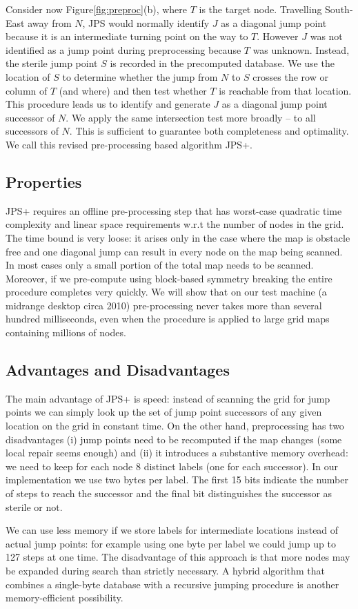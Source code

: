 Consider now Figure\ref{fig:preproc}(b), where $T$ is the target node.  
Travelling South-East away from $N$, JPS would normally identify 
$J$ as a diagonal jump point because it is an intermediate turning
point on the way to $T$.
However $J$ was not identified as a jump point during preprocessing 
because $T$ was unknown.  
Instead, the sterile jump point $S$ is recorded in the precomputed 
database. We use the location of $S$ to determine whether the jump from 
$N$ to $S$ crosses the row or column of $T$ (and where) and then test 
whether $T$ is reachable from that location. This procedure 
leads us to identify and generate $J$ as a diagonal jump point successor
of $N$. We apply the same intersection test more broadly -- to all 
successors of $N$. This is sufficient to guarantee both completeness 
and optimality. We call this revised pre-processing based algorithm 
JPS+.
\subsection*{Properties}
JPS+ requires an offline pre-processing step that has worst-case quadratic 
time complexity and linear space requirements w.r.t the number of nodes in 
the grid. The time bound is very loose: it arises only in the case 
where the map is obstacle free and one diagonal jump can result in
every node on the map being scanned. In most cases only a small portion
of the total map needs to be scanned. Moreover, if we pre-compute using block-based 
symmetry breaking the entire procedure completes very quickly.
We will show that on our test machine (a midrange desktop
circa 2010) pre-processing never takes more than several hundred milliseconds,
even when the procedure is applied to large grid maps containing millions
of nodes.
\subsection*{Advantages and Disadvantages}
The main advantage of JPS+ is speed: instead of scanning the grid for jump
points we can simply look up the set of jump point successors of any given
location on the grid in constant time.  On the other hand, preprocessing has
two disadvantages (i) jump points need to be recomputed if the map changes
(some local repair seems enough) and (ii) it introduces a substantive memory
overhead: we need to keep for each node 8 distinct labels (one for each
successor).  In our implementation we use two bytes per label. The first 15
bits indicate the number of steps to reach the successor and the final bit
distinguishes the successor as sterile or not.
\par
We can use less memory if we store labels for intermediate locations instead
of actual jump points: for example using one byte per label we could jump up
to 127 steps at one time. The disadvantage of this approach is that more nodes
may be expanded during search than strictly necessary. A hybrid algorithm that
combines a single-byte database with a recursive jumping procedure is another
memory-efficient possibility.
